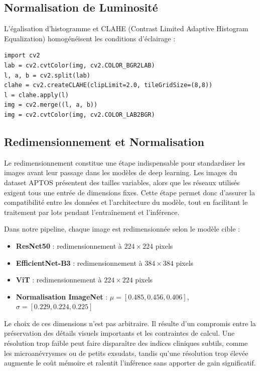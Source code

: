 \documentclass[12pt,a4paper,oneside]{report}
\begin{document}
\subsection{Normalisation de Luminosité}

L'égalisation d'histogramme et CLAHE (Contrast Limited Adaptive Histogram
Equalization) homogénéisent les conditions d'éclairage :

\begin{lstlisting}[caption={Normalisation de luminosité par CLAHE.}]
import cv2
lab = cv2.cvtColor(img, cv2.COLOR_BGR2LAB)
l, a, b = cv2.split(lab)
clahe = cv2.createCLAHE(clipLimit=2.0, tileGridSize=(8,8))
l = clahe.apply(l)
img = cv2.merge((l, a, b))
img = cv2.cvtColor(img, cv2.COLOR_LAB2BGR)
\end{lstlisting}

\subsection{Redimensionnement et Normalisation}

Le redimensionnement constitue une étape indispensable pour standardiser
les images avant leur passage dans les modèles de deep learning. Les images
du dataset APTOS présentent des tailles variables, alors que les réseaux
utilisés exigent tous une entrée de dimensions fixes. Cette étape permet
donc d'assurer la compatibilité entre les données et l'architecture du
modèle, tout en facilitant le traitement par lots pendant l'entraînement et
l'inférence.

Dans notre pipeline, chaque image est redimensionnée selon le modèle cible :

\begin{itemize}
    \item \textbf{ResNet50} : redimensionnement à $224 \times 224$ pixels
    \item \textbf{EfficientNet-B3} : redimensionnement à $384 \times 384$ pixels
    \item \textbf{ViT} : redimensionnement à $224 \times 224$ pixels
    \item \textbf{Normalisation ImageNet} : $\mu = [0.485, 0.456, 0.406]$,
          $\sigma = [0.229, 0.224, 0.225]$
\end{itemize}

Le choix de ces dimensions n'est pas arbitraire. Il résulte d'un compromis
entre la préservation des détails visuels importants et les contraintes de
calcul. Une résolution trop faible peut faire disparaître des indices
cliniques subtils, comme les microanévrysmes ou de petits exsudats, tandis
qu'une résolution trop élevée augmente le coût mémoire et ralentit
l'inférence sans apporter de gain significatif.
\end{document}

